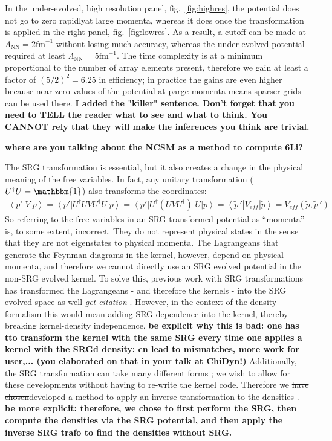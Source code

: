 \documentclass[a4paper,11pt]{article}
\newcommand{\br}[1]{\left\langle #1 \right |}
\newcommand{\kt}[1]{\left| #1 \right \rangle}
\newcommand{\LamNN}{\Lambda_{\mathrm{NN}}}
\newcommand{\ques}[1]{\color{red}\textit{ #1 }\color{black}}
\newcommand{\com}[1]{\color{blue}\small\textbf{ #1 }\color{black}\normalsize}
\newcommand{\replace}[2]{\sout{\protect#1}\color{blue}#2\color{black}}
\begin{document}
In the under-evolved, high resolution panel, fig.~\ref{fig:highres}, the potential does 
not go to zero rapidlyat large momenta, whereas it does once the
transformation is applied in the right panel, fig.~\ref{fig:lowres}. As a
result, a cutoff can be made at $\LamNN=2 \mathrm{fm}^{-1}$ without
losing much accuracy, whereas the under-evolved potential required at least $\LamNN=5 \mathrm{fm}^{-1}$.
The time complexity is at a minimum proportional to the number of array elements
present, therefore we gain at least a factor of $(5/2)^2=6.25$ in efficiency;
in practice the gains are even higher because near-zero values of the potential at parge momenta means sparser grids can be used there.\com{I added the "killer" sentence. Don't forget that you need to TELL the reader what to see and what to think. You CANNOT rely that they will make the inferences you think are trivial.}

\com{where are you talking about the NCSM as a method to compute 6Li?}

The SRG transformation is essential, but it also creates a
change in the physical meaning of the free variables.
In fact, any unitary transformation ($U^\dag U =\mathbbm{1}$) also transforms the coordinates:
\begin{align}
  \br{p'}V\kt{p} 
  = \br{p'} U^\dag U V U^\dag U \kt{p}
  = \br{p'} U^\dag\left( U V U^\dag\right)\;U
  \kt{p}
  = \br{\widetilde{p}\,'} V_{eff}
  \kt{\widetilde{p}}=V_{eff}(\widetilde{p},\widetilde{p}\,')
\end{align}
So referring to the free variables in an SRG-transformed potential as
``momenta'' is, to some extent, incorrect.
They do not represent physical states  in the sense that they are not eigenstates to physical momenta.
The Lagrangeans that generate the Feynman diagrams in the kernel, however,
depend on physical momenta, and therefore we cannot directly use an SRG
evolved potential in the non-SRG evolved kernel.
To solve this, previous work with SRG transformations has transformed the
Lagrangeans - and therefore the kernels - into the SRG evolved space
as well\ques{get citation}.
However, in the context of the density formalism this would mean adding SRG
dependence into the kernel, thereby breaking kernel-density independence. \com{be explicit why this is bad: one has tto transform the kernel with the same SRG every time one applies a kernel with the SRGd density: cn lead to mismatches, more work for user,... (you elaborated on that in your talk at ChiDyn!)}
Additionally, the SRG transformation can take many different forms \cite{SRG, Furnstahl2013};
we wish to allow for these developments
without having to re-write the kernel code.
Therefore we \replace{have chosen}{developed a method} to apply an inverse
transformation to the densities \cite{XiangXiang}. \com{be more explicit: therefore, we chose to first perform the SRG, then compute the densities via the SRG potential, and then apply the inverse SRG trafo to find the densities without SRG.}
\end{document}
